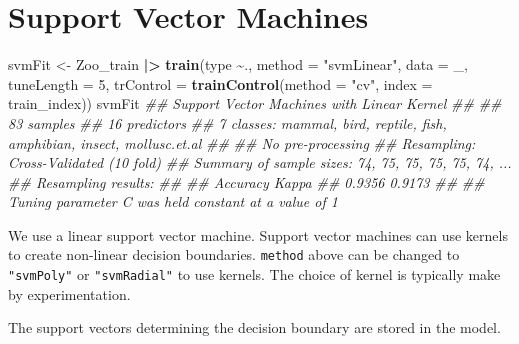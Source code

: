 \documentclass[
  notitlepage]{book}
\newenvironment{Shaded}{\begin{snugshade}}{\end{snugshade}}
\newcommand{\CommentTok}[1]{\textcolor[rgb]{0.56,0.35,0.01}{\textit{#1}}}
\newcommand{\DataTypeTok}[1]{\textcolor[rgb]{0.13,0.29,0.53}{#1}}
\newcommand{\DecValTok}[1]{\textcolor[rgb]{0.00,0.00,0.81}{#1}}
\newcommand{\ErrorTok}[1]{\textcolor[rgb]{0.64,0.00,0.00}{\textbf{#1}}}
\newcommand{\KeywordTok}[1]{\textcolor[rgb]{0.13,0.29,0.53}{\textbf{#1}}}
\newcommand{\NormalTok}[1]{#1}
\newcommand{\OperatorTok}[1]{\textcolor[rgb]{0.81,0.36,0.00}{\textbf{#1}}}
\newcommand{\StringTok}[1]{\textcolor[rgb]{0.31,0.60,0.02}{#1}}
\begin{document}
\hypertarget{support-vector-machines}{%
\section{Support Vector Machines}\label{support-vector-machines}}

\begin{Shaded}
\begin{Highlighting}[]
\NormalTok{svmFit \textless{}{-}}\StringTok{ }\NormalTok{Zoo\_train }\OperatorTok{|}\ErrorTok{\textgreater{}}\StringTok{ }\KeywordTok{train}\NormalTok{(type }\OperatorTok{\textasciitilde{}}\NormalTok{.,}
  \DataTypeTok{method =} \StringTok{"svmLinear"}\NormalTok{,}
  \DataTypeTok{data =}\NormalTok{ \_,}
    \DataTypeTok{tuneLength =} \DecValTok{5}\NormalTok{,}
    \DataTypeTok{trControl =} \KeywordTok{trainControl}\NormalTok{(}\DataTypeTok{method =} \StringTok{"cv"}\NormalTok{, }
                             \DataTypeTok{index =}\NormalTok{ train\_index))}
\NormalTok{svmFit}
\CommentTok{\#\# Support Vector Machines with Linear Kernel }
\CommentTok{\#\# }
\CommentTok{\#\# 83 samples}
\CommentTok{\#\# 16 predictors}
\CommentTok{\#\#  7 classes: \textquotesingle{}mammal\textquotesingle{}, \textquotesingle{}bird\textquotesingle{}, \textquotesingle{}reptile\textquotesingle{}, \textquotesingle{}fish\textquotesingle{}, \textquotesingle{}amphibian\textquotesingle{}, \textquotesingle{}insect\textquotesingle{}, \textquotesingle{}mollusc.et.al\textquotesingle{} }
\CommentTok{\#\# }
\CommentTok{\#\# No pre{-}processing}
\CommentTok{\#\# Resampling: Cross{-}Validated (10 fold) }
\CommentTok{\#\# Summary of sample sizes: 74, 75, 75, 75, 75, 74, ... }
\CommentTok{\#\# Resampling results:}
\CommentTok{\#\# }
\CommentTok{\#\#   Accuracy  Kappa }
\CommentTok{\#\#   0.9356    0.9173}
\CommentTok{\#\# }
\CommentTok{\#\# Tuning parameter \textquotesingle{}C\textquotesingle{} was held constant at a value of 1}
\end{Highlighting}
\end{Shaded}

We use a linear support vector machine.
Support vector machines can use kernels to create non-linear decision boundaries.
\texttt{method} above can be changed to \texttt{"svmPoly"} or \texttt{"svmRadial"} to
use kernels. The choice of kernel is typically make by experimentation.

The support vectors determining the decision boundary are stored in the model.
\end{document}
